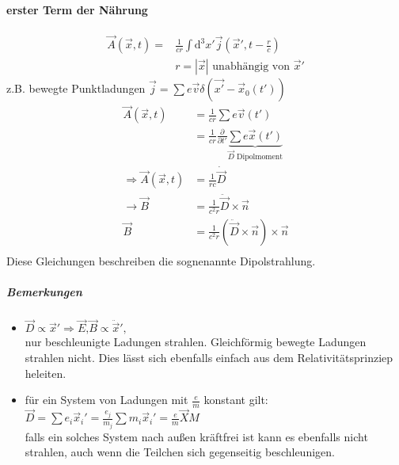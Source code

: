\documentclass[a4paper]{article}
\newcommand{\intd}{\int\!\mathrm{d}}
\begin{document}
\paragraph{erster Term der Nährung}
\begin{align}
\vec{A}(\vec{x},t)=&\frac{1}{cr}\intd^3x' \vec{j}(\vec{x}',t-\frac{r}{c})\\
&r=|\vec{x}| \text{ unabhängig von }\vec{x}'
\end{align}
z.B. bewegte Punktladungen $\vec{j}=\sum e\vec{v}
\delta(\vec{x'}-\vec{x}_0(t'))$
\begin{align}
\vec{A}(\vec{x},t)&=\frac{1}{cr}\sum e\vec{v}(t')\\
&=\frac{1}{cr}\frac{\partial}{\partial t'}\underbrace{\sum
e\vec{x}(t')}_{\vec{D} \text{ Dipolmoment}}\\
\Rightarrow \vec{A}(\vec{x},t)&= \frac{1}{rc}\dot{\vec{D}}\\
\rightarrow \vec{B}&=\frac{1}{c^2r}\ddot{\vec{D}}\times\vec{n}\\
\vec{B}&=\frac{1}{c^2r}\left(\ddot{\vec{D}}\times\vec{n}\right)\times\vec{n}\\
\end{align}
Diese Gleichungen beschreiben die sognenannte Dipolstrahlung.
\subparagraph{Bemerkungen}
\begin{itemize}
  \item $\vec{D}\propto\vec{x}' \Rightarrow
  \vec{E}\text{,}\vec{B}\propto\ddot{\vec{x}}',$\\ nur beschleunigte Ladungen
  strahlen. Gleichförmig bewegte Ladungen strahlen nicht. Dies lässt sich
  ebenfalls einfach aus dem Relativitätsprinziep heleiten.
  \item für ein System von Ladungen mit $\frac{e}{m}$ konstant gilt:\\
  $\vec{D}=\sum e_i\vec{x}_i'=\frac{e_j}{m_j}\sum
  m_i\vec{x}_i'=\frac{e}{m}\vec{X}M$\\ falls ein solches System nach
  außen kräftfrei ist kann es ebenfalls nicht strahlen, auch wenn die Teilchen
  sich gegenseitig beschleunigen.
\end{itemize}
\end{document}
